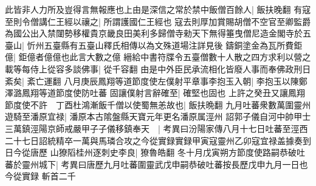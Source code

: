 此皆非人力所及豈得言無報應也上由是深信之常於禁中飯僧百餘人|{
	飯扶晚翻}
有寇至則令僧講仁王經以禳之|{
	所謂護國仁王經也}
寇去則厚加賞賜胡僧不空官至卿監爵為國公出入禁闥勢移權貴京畿良田美利多歸僧寺勑天下無得箠曳僧尼造金閣寺於五臺山|{
	忻州五臺縣有五臺山釋氏相傳以為文殊道場注詳見後}
鑄銅塗金為瓦所費鉅億|{
	鉅億者億億也此言大數之億}
縉給中書符牒令五臺僧數十人散之四方求利以營之載等每侍上從容多談佛事|{
	從千容翻}
由是中外臣民承流相化皆廢人事而奉佛政刑日紊矣|{
	紊亡運翻}
八月庚辰鳳翔等道節度使左僕射平章事李抱玉入朝|{
	李抱玉以陳鄭澤潞鳳翔等道節度使防吐蕃}
固讓僕射言辭確至|{
	確堅也固也}
上許之癸丑又讓鳳翔節度使不許　丁酉杜鴻漸飯千僧以使蜀無恙故也|{
	飯扶晩翻}
九月吐蕃衆數萬圍靈州遊騎至潘原宜禄|{
	潘原本古隂盤縣天寶元年更名潘原属涇州}
詔郭子儀自河中帥甲士三萬鎮涇陽京師戒嚴甲子子儀移鎮奉天　|{
	考異曰汾陽家傳八月十七日吐蕃至涇西二十七日詔統精卒一萬與馬璘合攻之今從實録實録甲寅寇靈州乙卯寇宜禄盖據奏到日今從唐歷}
山獠䧟桂州逐刺史李良|{
	獠魯皓翻}
冬十月戊寅朔方節度使路嗣恭破吐蕃於靈州城下|{
	考異曰唐歷九月吐蕃圍靈武戊申嗣恭破吐蕃按長歷戊申九月一日也今從實録}
斬首二千

